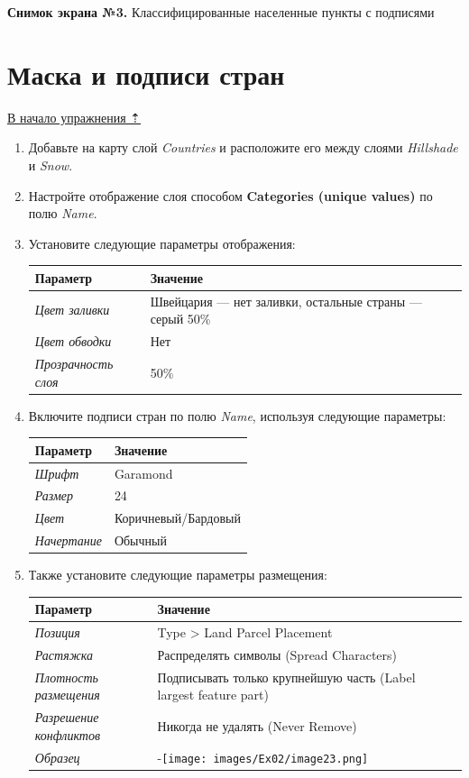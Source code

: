 \documentclass[12pt,]{book}
\begin{document}
\textbf{Снимок экрана №3.} Классифицированные населенные пункты с подписями

\hypertarget{map-design-general-mask}{%
\section{Маска и подписи стран}\label{map-design-general-mask}}

\protect\hyperlink{map-design-general}{В начало упражнения ⇡}

\begin{enumerate}
\def\labelenumi{\arabic{enumi}.}
\item
  Добавьте на карту слой \emph{Countries} и расположите его между слоями \emph{Hillshade} и \emph{Snow}.
\item
  Настройте отображение слоя способом \textbf{Categories (unique values)} по полю \emph{Name}.
\item
  Установите следующие параметры отображения:

  \begin{longtable}[]{@{}ll@{}}
  \toprule
  Параметр & Значение\tabularnewline
  \midrule
  \endhead
  \emph{Цвет заливки} & Швейцария --- нет заливки, остальные страны --- серый 50\%\tabularnewline
  \emph{Цвет обводки} & Нет\tabularnewline
  \emph{Прозрачность слоя} & 50\%\tabularnewline
  \bottomrule
  \end{longtable}
\item
  Включите подписи стран по полю \emph{Name}, используя следующие параметры:

  \begin{longtable}[]{@{}ll@{}}
  \toprule
  Параметр & Значение\tabularnewline
  \midrule
  \endhead
  \emph{Шрифт} & Garamond\tabularnewline
  \emph{Размер} & 24\tabularnewline
  \emph{Цвет} & Коричневый/Бардовый\tabularnewline
  \emph{Начертание} & Обычный\tabularnewline
  \bottomrule
  \end{longtable}
\item
  Также установите следующие параметры размещения:

  \begin{longtable}[]{@{}ll@{}}
  \toprule
  Параметр & Значение\tabularnewline
  \midrule
  \endhead
  \emph{Позиция} & Type \textgreater{} Land Parcel Placement\tabularnewline
  \emph{Растяжка} & Распределять символы (Spread Characters)\tabularnewline
  \emph{Плотность размещения} & Подписывать только крупнейшую часть (Label largest feature part)\tabularnewline
  \emph{Разрешение конфликтов} & Никогда не удалять (Never Remove)\tabularnewline
  \emph{Образец} & -\texttt{[image: images/Ex02/image23.png]}\tabularnewline
  \bottomrule
  \end{longtable}
\end{enumerate}
\end{document}
